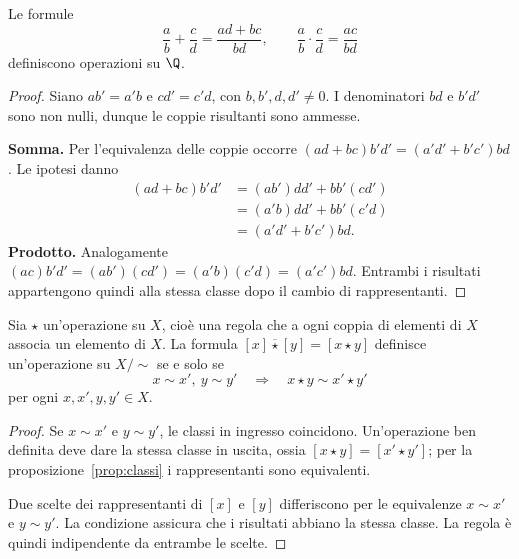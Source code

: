 \begin{proposizione}
Le formule
\[
\frac ab+\frac cd=\frac{ad+bc}{bd},\qquad
\frac ab\cdot\frac cd=\frac{ac}{bd}
\]
definiscono operazioni su $\Q$.
\end{proposizione}
\begin{proof}
Siano $ab'=a'b$ e $cd'=c'd$, con $b,b',d,d'\ne0$. I denominatori $bd$ e $b'd'$ sono non nulli, dunque le coppie risultanti sono ammesse.

\textbf{Somma.} Per l'equivalenza delle coppie occorre $(ad+bc)b'd'=(a'd'+b'c')bd$. Le ipotesi danno
\[
\begin{aligned}
(ad+bc)b'd'&=(ab')dd'+bb'(cd')\\
&=(a'b)dd'+bb'(c'd)\\
&=(a'd'+b'c')bd.
\end{aligned}
\]
\textbf{Prodotto.} Analogamente $(ac)b'd'=(ab')(cd')=(a'b)(c'd)=(a'c')bd$. Entrambi i risultati appartengono quindi alla stessa classe dopo il cambio di rappresentanti.
\end{proof}

\begin{proposizione}
Sia $\star$ un'operazione su $X$, cioè una regola che a ogni coppia di elementi di $X$ associa un elemento di $X$. La formula $[x]\mathbin{\overline\star}[y]=[x\star y]$ definisce un'operazione su $X/{\sim}$ se e solo se
\[
x\sim x',\ y\sim y'\quad\Longrightarrow\quad x\star y\sim x'\star y'
\]
per ogni $x,x',y,y'\in X$.
\end{proposizione}
\begin{proof}
\passomath{\Rightarrow} Se $x\sim x'$ e $y\sim y'$, le classi in ingresso coincidono. Un'operazione ben definita deve dare la stessa classe in uscita, ossia $[x\star y]=[x'\star y']$; per la proposizione~\ref{prop:classi} i rappresentanti sono equivalenti.

\passomath{\Leftarrow} Due scelte dei rappresentanti di $[x]$ e $[y]$ differiscono per le equivalenze $x\sim x'$ e $y\sim y'$. La condizione assicura che i risultati abbiano la stessa classe. La regola è quindi indipendente da entrambe le scelte.
\end{proof}
